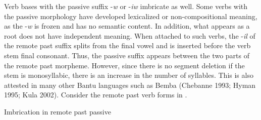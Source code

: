 \documentclass[output=paper]{langsci/langscibook}
\begin{document}
\begin{styleBodyTextIndent}
Verb bases with the passive suffix -\emph{w} or -\emph{iw }imbricate as well. Some verbs with the passive morphology have developed lexicalized or non-compositional meaning, as the -\emph{w} is frozen and has no semantic content. In addition, what appears as a root does not have independent meaning. When attached to such verbs, the -\emph{il} of the remote past suffix splits from the final vowel and is inserted before the verb stem final consonant. Thus, the passive suffix appears between the two parts of the remote past morpheme. However, since there is no segment deletion if the stem is monosyllabic, there is an increase in the number of syllables. This is also attested in many other Bantu languages such as Bemba (Chebanne 1993; Hyman 1995; Kula 2002). Consider the remote past verb forms in .
\end{styleBodyTextIndent}

\begin{table}
\caption{Imbrication in remote past passive}
\label{tab:25}
\end{table}
\end{document}
